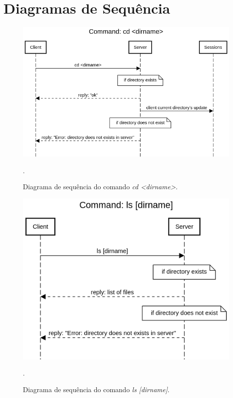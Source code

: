 \documentclass[conference]{IEEEtran}
\begin{document}
\section*{Diagramas de Sequência}

\begin{figure}[H]
\centering
\centerline{\includegraphics[scale=0.3]{diagrams/Command_cd_dirname.png}}
\caption{Diagrama de sequência do comando \textit{cd <dirname>}.}.
\label{cd}
\end{figure}

\begin{figure}[H]
\centering
\centerline{\includegraphics[scale=0.4]{diagrams/Command_ls_dirname.png}}
\caption{Diagrama de sequência do comando \textit{ls [dirname]}.}.
\label{ls}
\end{figure}
\end{document}
